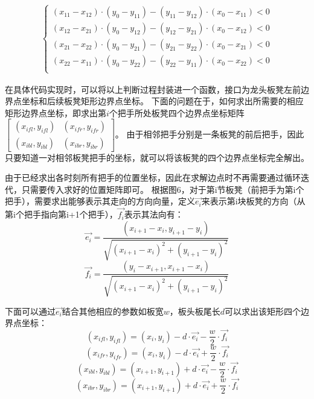 \documentclass{cumcmthesis1}
\begin{document}
\begin{equation}
    \begin{aligned}
        \begin{cases}
            (x_{11} - x_{12}) \cdot (y_{0} - y_{11}) - (y_{11} - y_{12}) \cdot (x_{0} - x_{11}) < 0 \\
            (x_{12} - x_{21}) \cdot (y_{0} - y_{12}) - (y_{12} - y_{21}) \cdot (x_{0} - x_{12}) < 0 \\
            (x_{21} - x_{22}) \cdot (y_{0} - y_{21}) - (y_{21} - y_{22}) \cdot (x_{0} - x_{21}) < 0 \\
            (x_{22} - x_{11}) \cdot (y_{0} - y_{22}) - (y_{22} - y_{11}) \cdot (x_{0} - x_{22}) < 0 \\
        \end{cases}
    \end{aligned}
\end{equation}
\par
在具体代码实现时，可以将以上判断过程封装进一个函数，接口为龙头板凳左前边界点坐标和后续板凳矩形边界点坐标。
下面的问题在于，如何求出所需要的相应矩形边界点坐标，即求出第$i$个把手所处板凳四个边界点坐标矩阵
$ \begin{bmatrix}
    (x_{ifl}, y_{ifl}) & (x_{ifr}, y_{ifr}) \\
    (x_{ibl}, y_{ibl}) & (x_{ibr}, y_{ibr})
\end{bmatrix} $。
由于相邻把手分别是一条板凳的前后把手，因此只要知道一对相邻板凳把手的坐标，就可以将该板凳的四个边界点坐标完全解出。
\par
由于已经求出各时刻所有把手的位置坐标，因此在求解边点时不再需要通过循环迭代，只需要传入求好的位置矩阵即可。
根据图6，对于第i节板凳（前把手为第i个把手），需要求出能够表示其走向的方向向量，定义$\vec{e_i}$来表示第i块板凳的方向（从第i个把手指向第i+1个把手），$\vec{f_i}$表示其法向有：
\begin{equation}
     \vec{e_i}=\frac{(x_{i+1}-x_i,y_{i+1}-y_i)}{\sqrt{(x_{i+1}-x_i)^2+(y_{i+1}-y_i)^2}}
\end{equation}
\begin{equation}
    \vec{f_i}=\frac{(y_{i}-x_{i+1},x_{i+1}-x_i)}{\sqrt{(x_{i+1}-x_i)^2+(y_{i+1}-y_i)^2}}
\end{equation}
\par
下面可以通过$\vec{e_i}$结合其他相应的参数如板宽$w$，板头板尾长$d $可以求出该矩形四个边界点坐标：
\begin{equation}
    (x_{ifl}, y_{ifl})=(x_i,y_i)-d \cdot \vec{e_i} -\frac{w}{2} \cdot\vec{f_i}
\end{equation}
\begin{equation}
    (x_{ifr}, y_{ifr})=(x_i,y_i)-d \cdot \vec{e_i} +\frac{w}{2} \cdot\vec{f_i}
\end{equation}
\begin{equation}
    (x_{ibl}, y_{ibl})=(x_{i+1},y_{i+1})+d \cdot \vec{e_i} -\frac{w}{2} \cdot\vec{f_i}
\end{equation}
\begin{equation}
    (x_{ibr}, y_{ibr})=(x_{i+1},y_{i+1})+d \cdot \vec{e_i} +\frac{w}{2} \cdot\vec{f_i}
\end{equation}
\end{document}
